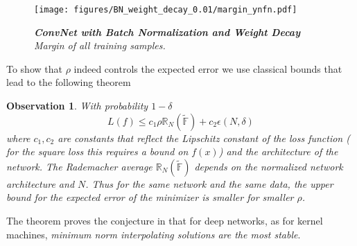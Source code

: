 \documentclass[11pt]{article}
\newtheorem{observation}{Observation}
\begin{document}

\begin{figure}
  \centering
  \texttt{[image: figures/BN\_weight\_decay\_0.01/margin\_ynfn.pdf]} 
  \caption {\it  \textbf{ConvNet with Batch Normalization and Weight Decay} Margin of all training samples.}  \label{appendix:fig:conv4_BN_wd_0.01:margin}    
\end{figure}



To show that $\rho$ indeed controls the expected error we use
classical bounds that lead  to the
following theorem

\begin{observation}
  \label{boundtp}
 With probability $1-\delta$
\begin{equation}
L(f) \leq  c_1 \rho  \mathbb{R}_N(\tilde{\mathbb{F}})+ c_2 \epsilon (N, \delta)
\end{equation}
\noindent where $c_1, c_2$ are constants that reflect the Lipschitz constant of  the loss
function ( for the square loss this requires a bound on $f(x)$) and
the architecture of the network. The Rademacher average
$\mathbb{R}_N(\tilde{\mathbb{F}})$ depends on the normalized network
architecture and $N$. Thus for the same network and the same data, the upper bound for the expected
error of the minimizer is smaller for smaller $\rho$.
\vspace{0.1in}
\end{observation}

The theorem proves the conjecture in \cite{Foundations} that for deep
networks, as for kernel machines, {\it minimum norm interpolating
  solutions are the most stable}.
\end{document}
